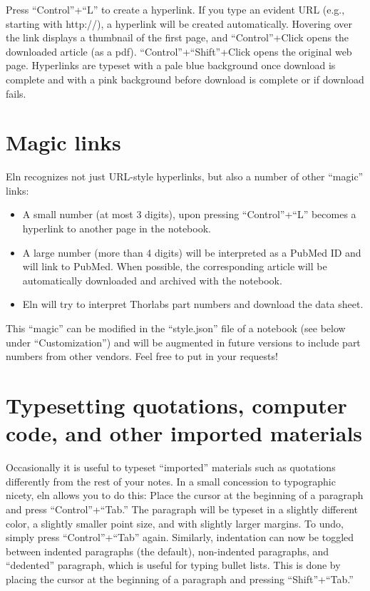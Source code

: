 \documentclass[11pt]{report}
\begin{document}
Press ``Control''+``L'' to create a hyperlink. If you
type an evident URL (e.g., starting with http://), a hyperlink will be
created automatically. Hovering over the link displays a
thumbnail of the first page, and ``Control''+Click opens the
downloaded article (as a pdf). ``Control''+``Shift''+Click opens the
original web page. Hyperlinks are typeset with a pale blue background
once download is complete and with a pink background before download
is complete or if download fails.

\section{Magic links}

Eln recognizes not just URL-style hyperlinks, but also a number of
other ``magic'' links:
\begin{itemize}
\item A small number (at most 3 digits), upon pressing ``Control''+``L''
becomes a hyperlink to another page in the notebook.
\item A large number (more than 4 digits)
will be interpreted as a PubMed ID and will link to PubMed. When
possible, the corresponding article will be automatically downloaded
and archived with the notebook. 
\item Eln will try to interpret Thorlabs part numbers and
  download the data sheet.
\end{itemize}
This ``magic'' can be modified in the ``style.json'' file of a
notebook (see below under ``Customization'') and will be augmented in
future versions to include part numbers from other vendors. Feel free
to put in your requests!

\section{Typesetting quotations, computer code, and other imported materials}

Occasionally it is useful to typeset ``imported'' materials such as
quotations differently from the rest of your notes. In a small
concession to typographic nicety, eln allows you to do this: Place
the cursor at
the beginning of a paragraph and press ``Control''+``Tab.'' The
paragraph will be typeset in a slightly different color, a slightly
smaller point size, and with slightly larger margins. To undo, simply
press ``Control''+``Tab'' again. Similarly, indentation can now be
toggled between indented paragraphs (the default), non-indented
paragraphs, and ``dedented'' paragraph, which is useful for typing
bullet lists. This is done by placing the cursor at the beginning of a
paragraph and pressing ``Shift''+``Tab.''
\end{document}
